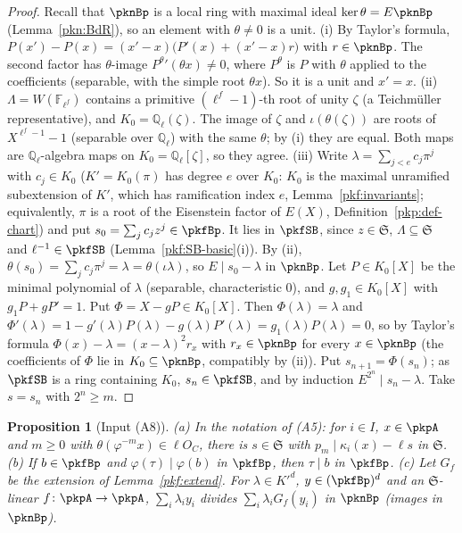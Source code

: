 \documentclass[10pt]{amsart}
\newtheorem{proposition}[theorem]{Proposition}
\theoremstyle{definition}
\theoremstyle{remark}
\newcommand{\Q}{\mathbb Q}
\begin{document}
\begin{proof}
Recall that $\pknBp$ is a local ring with maximal ideal $\ker\theta=E\pknBp$ (Lemma~\ref{pkn:BdR}), so
an element with $\theta\ne0$ is a unit.
(i) By Taylor's formula, $P(x')-P(x)=(x'-x)\bigl(P'(x)+(x'-x)r\bigr)$ with $r\in\pknBp$. The second
factor has $\theta$-image $P^\theta{}'(\theta x)\ne0$, where $P^\theta$ is $P$ with $\theta$ applied to the
coefficients (separable, with the simple root $\theta x$). So it is a unit and $x'=x$.
(ii) $\Lambda=W(\mathbb F_{\ell^f})$ contains a primitive $(\ell^f-1)$-th root of unity $\zeta$ (a
Teichm\"uller representative), and $K_0=\Q_\ell(\zeta)$. The image of $\zeta$ and $\iota(\theta(\zeta))$
are roots of $X^{\ell^f-1}-1$ (separable over $\Q_\ell$) with the same $\theta$; by (i) they are equal.
Both maps are $\Q_\ell$-algebra maps on $K_0=\Q_\ell[\zeta]$, so they agree.
(iii) Write $\lambda=\sum_{j<e}c_j\pi^j$ with $c_j\in K_0$ ($K'=K_0(\pi)$ has degree $e$ over $K_0$: $K_0$ is the maximal unramified subextension of $K'$, which has ramification index $e$, Lemma~\ref{pkf:invariants}; equivalently, $\pi$ is a root of the Eisenstein factor of $E(X)$, Definition~\ref{pkp:def-chart}) and put $s_0=\sum_jc_jz^j\in\pkfBp$. It lies in
$\pkfSB$, since $z\in\mathfrak S$, $\Lambda\subseteq\mathfrak S$ and $\ell^{-1}\in\pkfSB$
(Lemma~\ref{pkf:SB-basic}(i)). By (ii), $\theta(s_0)=\sum_jc_j\pi^j=\lambda=\theta(\iota\lambda)$, so
$E\mid s_0-\lambda$ in $\pknBp$. Let $P\in K_0[X]$ be the minimal polynomial of $\lambda$ (separable,
characteristic $0$), and $g,g_1\in K_0[X]$ with $g_1P+gP'=1$. Put $\Phi=X-gP\in K_0[X]$. Then
$\Phi(\lambda)=\lambda$ and $\Phi'(\lambda)=1-g'(\lambda)P(\lambda)-g(\lambda)P'(\lambda)=g_1(\lambda)
P(\lambda)=0$, so by Taylor's formula $\Phi(x)-\lambda=(x-\lambda)^2r_x$ with $r_x\in\pknBp$ for every
$x\in\pknBp$ (the coefficients of $\Phi$ lie in $K_0\subseteq\pknBp$, compatibly by (ii)). Put
$s_{n+1}=\Phi(s_n)$; as $\pkfSB$ is a ring containing $K_0$, $s_n\in\pkfSB$, and by induction
$E^{2^n}\mid s_n-\lambda$. Take $s=s_n$ with $2^n\ge m$.
\end{proof}

\begin{proposition}[Input (A8)]\label{pkr:I8}
(a) In the notation of (A5): for $i\in I$, $x\in\pkpA$ and $m\ge0$ with $\theta(\varphi^{-m}x)\in\ell
O_C$, there is $s\in\mathfrak S$ with $p_m\mid\kappa_i(x)-\ell s$ in $\mathfrak S$.
(b) If $b\in\pkfBp$ and $\varphi(\tau)\mid\varphi(b)$ in $\pkfBp$, then $\tau\mid b$ in $\pkfBp$.
(c) Let $G_f$ be the extension of Lemma~\ref{pkf:extend}. For $\lambda\in K'^d$, $y\in(\pkfBp)^d$ and an
$\mathfrak S$-linear $f\colon\pkpA\to\pkpA$, $\sum_i\lambda_iy_i$ divides $\sum_i\lambda_iG_f(y_i)$ in
$\pknBp$ (images in $\pknBp$).
\end{proposition}
\end{document}
